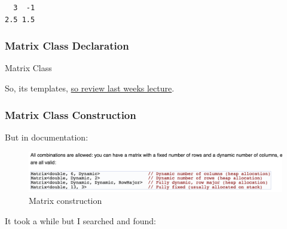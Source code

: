 \begin{verbatim}
  3  -1
2.5 1.5
\end{verbatim}

\subsubsection{Matrix Class Declaration}\label{matrix-class-declaration}

Matrix Class

\begin{Shaded}
\begin{Highlighting}[]
\NormalTok{<}      
 
  \NormalTok{: } 
\NormalTok{\{}
\end{Highlighting}
\end{Shaded}

So, its templates,
\href{http://development.rc.ucl.ac.uk/training/rcwithcpp/session02/}{so
review last weeks lecture}.

\subsubsection{Matrix Class
Construction}\label{matrix-class-construction}

But in documentation:

\begin{figure}[htbp]
\centering
\includegraphics{03libraries/figures/eigenMatrixDynamic.png}
\caption{Matrix construction}
\end{figure}

It took a while but I searched and found:

\begin{Shaded}
\begin{Highlighting}[]
  \NormalTok{;}
\end{Highlighting}
\end{Shaded}

